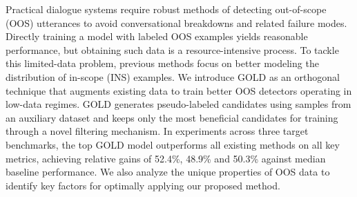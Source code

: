 Practical dialogue systems require robust methods of detecting out-of-scope (OOS) utterances to avoid conversational breakdowns and related failure modes. Directly training a model with labeled OOS examples yields reasonable performance, but obtaining such data is a resource-intensive process.  To tackle this limited-data problem, previous methods focus on better modeling the distribution of in-scope (INS) examples. We introduce GOLD as an orthogonal technique that augments existing data to train better OOS detectors operating in low-data regimes. GOLD generates pseudo-labeled candidates using samples from an auxiliary dataset and keeps only the most beneficial candidates for training through a novel filtering mechanism. In experiments across three target benchmarks, the top GOLD model outperforms all existing methods on all key metrics, achieving relative gains of 52.4\%, 48.9\% and 50.3\% against median baseline performance. We also analyze the unique properties of OOS data to identify key factors for optimally applying our proposed method.
